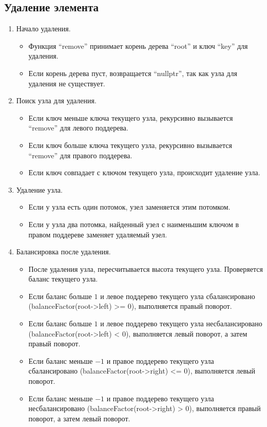 \documentclass[12pt, a4paper]{article}
\begin{document}
\subsection{Удаление элемента}
\begin{enumerate}
    \item Начало удаления.
    \begin{itemize}
        \item[---] Функция ``remove'' принимает корень дерева ``root'' и ключ ``key'' для удаления.
        \item[---] Если корень дерева пуст, возвращается ``nullptr'', так как узла для удаления не существует.
    \end{itemize}
    \item Поиск узла для удаления.
    \begin{itemize}
        \item[---] Если ключ меньше ключа текущего узла, рекурсивно вызывается ``remove'' для левого поддерева.
        \item[---] Если ключ больше ключа текущего узла, рекурсивно вызывается ``remove'' для правого поддерева.
        \item[---] Если ключ совпадает с ключом текущего узла, происходит удаление узла.
    \end{itemize}
    \item Удаление узла.
    \begin{itemize}
        \item[---] Если у узла есть один потомок, узел заменяется этим потомком.
        \item[---] Если у узла два потомка, найденный узел с наименьшим ключом в правом поддереве заменяет удаляемый узел.
    \end{itemize}
    \item Балансировка после удаления.
    \begin{itemize}
        \item[---] После удаления узла, пересчитывается высота текущего узла. Проверяется баланс текущего узла.
        \item[---] Если баланс больше $1$ и левое поддерево текущего узла сбалансировано (balanceFactor(root->left) >= $0$), выполняется правый поворот.
        \item[---] Если баланс больше $1$ и левое поддерево текущего узла несбалансировано (balanceFactor(root->left) < $0$), выполняется левый поворот, а затем правый поворот.
        \item[---] Если баланс меньше $-1$ и правое поддерево текущего узла сбалансировано (balanceFactor(root->right) <= $0$), выполняется левый поворот.
        \item[---] Если баланс меньше $-1$ и правое поддерево текущего узла несбалансировано (balanceFactor(root->right) > $0$), выполняется правый поворот, а затем левый поворот. 
    \end{itemize}
\end{enumerate}
\end{document}
